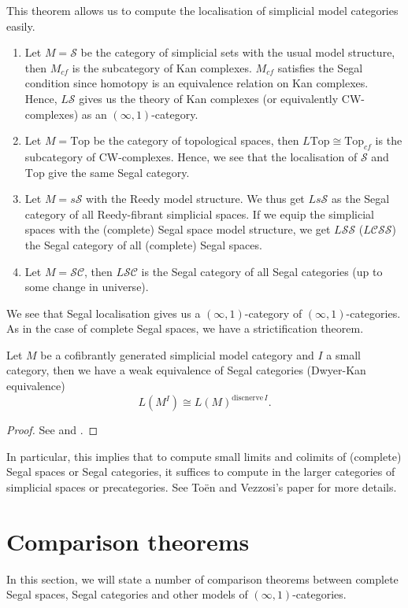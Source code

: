 \begin{refsection}
This theorem allows us to compute the localisation of simplicial model categories easily.
\begin{eg}
\begin{enumerate}
\item Let $M=\mathcal S$ be the category of simplicial sets with the usual model structure, then $M_{cf}$ is the subcategory of Kan complexes. $M_{cf}$ satisfies the Segal condition since homotopy is an equivalence relation on Kan complexes. Hence, $L\mathcal S$ gives us the theory of Kan complexes (or equivalently CW-complexes) as an $(\infty,1)$-category.
\item Let $M=\mathrm{Top}$ be the category of topological spaces, then $L\mathrm{Top}\cong\mathrm{Top}_{cf}$ is the subcategory of CW-complexes. Hence, we see that the localisation of $\mathcal S$ and $\mathrm{Top}$ give the same Segal category.
\item Let $M=s\mathcal S$ with the Reedy model structure. We thus get $Ls\mathcal S$ as the Segal category of all Reedy-fibrant simplicial spaces. If we equip the simplicial spaces with the (complete) Segal space model structure, we get $L\mathcal{SS}$ ($L\mathcal{CSS}$) the Segal category of all (complete) Segal spaces.
\item Let $M=\mathcal{SC}$, then $L\mathcal{SC}$ is the Segal category of all Segal categories (up to some change in universe).
\end{enumerate}
\end{eg}
We see that Segal localisation gives us a $(\infty,1)$-category of $(\infty,1)$-categories. As in the case of complete Segal spaces, we have a strictification theorem.

\begin{thm}
Let $M$ be a cofibrantly generated simplicial model category and $I$ a small category, then we have a weak equivalence of Segal categories (Dwyer-Kan equivalence)
$$L(M^I)\cong L(M)^{\mathrm{discnerve}\,I}.$$
\end{thm}
\begin{proof}
See \cite{hs} and \cite{tv}.
\end{proof}

In particular, this implies that to compute small limits and colimits of (complete) Segal spaces or Segal categories, it suffices to compute in the larger categories of simplicial spaces or precategories. See To\"en and Vezzosi's paper \cite{tv} for more details.


\section{Comparison theorems}
In this section, we will state a number of comparison theorems between complete Segal spaces, Segal categories and other models of $(\infty,1)$-categories.


\end{refsection}

